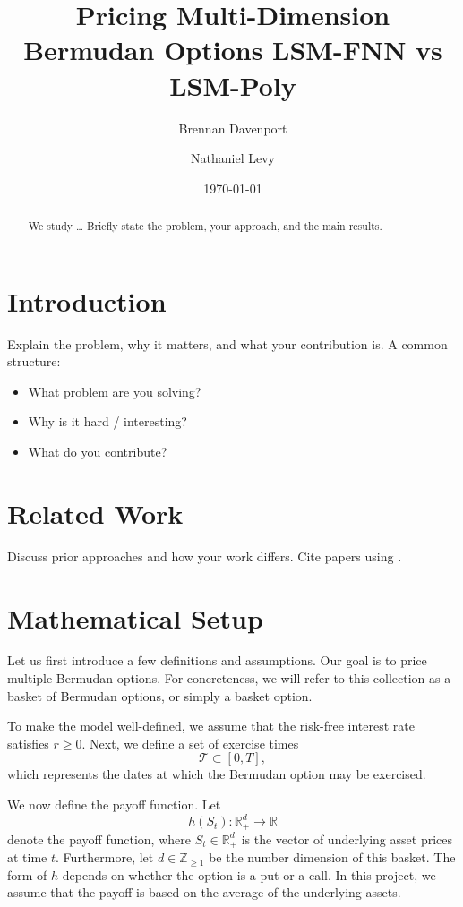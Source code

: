 \documentclass[11pt]{article}
\title{\textbf{Pricing Multi-Dimension Bermudan Options LSM-FNN vs LSM-Poly}}
\author[1]{Brennan Davenport}
\author[1]{Nathaniel Levy}
\affil[1]{University of Georgia, USA \\
\texttt{\{Brennan.Davenport@uga.edu, Nathaniel.Levy@uga.edu\}}}
\date{\today}
\theoremstyle{definition}
\theoremstyle{plain}
\theoremstyle{remark}
\begin{document}
\maketitle

\begin{abstract}
We study \ldots  
Briefly state the problem, your approach, and the main results.
\end{abstract}

\section{Introduction}
\label{sec:intro}

Explain the problem, why it matters, and what your contribution is.
A common structure:
\begin{itemize}
    \item What problem are you solving?
    \item Why is it hard / interesting?
    \item What do you contribute?
\end{itemize}

\section{Related Work}
\label{sec:related}

Discuss prior approaches and how your work differs.
Cite papers using \cite{example_reference}.

\section{Mathematical Setup}
\label{sec:setup}


Let us first introduce a few definitions and assumptions. Our goal is to price multiple Bermudan options. 
For concreteness, we will refer to this collection as a basket of Bermudan options, or simply a basket option.

To make the model well-defined, we assume that the risk-free interest rate satisfies \(r \ge 0\). 
Next, we define a set of exercise times
\[
\mathcal{T} \subset [0, T],
\] 
which represents the dates at which the Bermudan option may be exercised.

We now define the payoff function. Let  
\[
h(S_t) : \mathbb{R}_+^d \to \mathbb{R}
\]  
denote the payoff function, where \(S_t \in \mathbb{R}_+^d\) is the vector of underlying asset prices 
at time \(t\). Furthermore, let \(d \in \mathbb{Z}_{\geq 1}\) be the number dimension of this basket.
The form of \(h\) depends on whether the option is a put or a call. In this project, we 
assume that the payoff is based on the average of the underlying assets.
\end{document}
